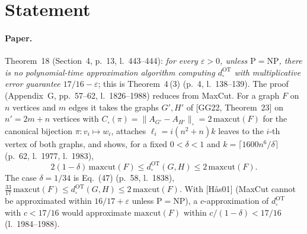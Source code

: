 

\paperversion

\section{Statement}

\paragraph{Paper.} Theorem~18 (Section~4, p.~13, l.~443--444): \emph{for every $\varepsilon>0$, unless
$\mathrm{P}=\mathrm{NP}$, there is no polynomial-time approximation algorithm computing $d^{\mathrm{OT}}_\square$
with multiplicative error guarantee $17/16-\varepsilon$}; this is Theorem~4\,(3) (p.~4, l.~138--139). The proof
(Appendix~G, pp.~57--62, l.~1826--1988) reduces from MaxCut. For a graph $F$ on $n$ vertices and $m$ edges it takes the
graphs $G',H'$ of [GG22, Theorem~23] on $n'=2m+n$ vertices with $C_\square(\pi)=\|A_{G'}-A_{H'}\|_\square=
2\,\mathrm{maxcut}(F)$ for the canonical bijection $\pi\colon v_i\mapsto w_i$, attaches $\ell_i=i(n^2+n)k$
leaves to the $i$-th vertex of both graphs, and shows, for a fixed $0<\delta<1$ and $k=\lceil1600n^6/\delta\rceil$
(p.~62, l.~1977, l.~1983),
\[ 2(1-\delta)\,\mathrm{maxcut}(F)\le d^{\mathrm{OT}}_\square(G,H)\le2\,\mathrm{maxcut}(F). \]
The case $\delta=1/34$ is Eq.~(47) (p.~58, l.~1838), $\tfrac{33}{17}\,\mathrm{maxcut}(F)\le
d^{\mathrm{OT}}_\square(G,H)\le2\,\mathrm{maxcut}(F)$. With [H\aa s01] (MaxCut cannot be approximated within
$16/17+\varepsilon$ unless $\mathrm{P}=\mathrm{NP}$), a $c$-approximation of $d^{\mathrm{OT}}_\square$ with
$c<17/16$ would approximate $\mathrm{maxcut}(F)$ within $c/(1-\delta)<17/16$ (l.~1984--1988).

